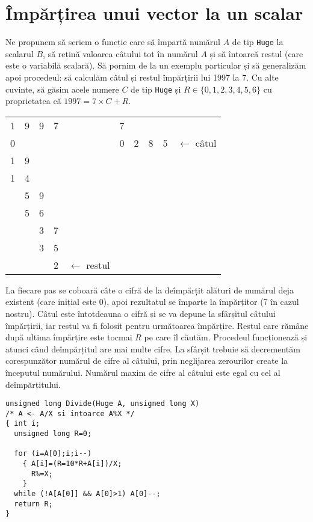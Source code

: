 \section{Împărțirea unui vector la un scalar}

Ne propunem să scriem o funcție care să împartă numărul $A$ de tip {\tt Huge}
la scalarul $B$, să rețină valoarea câtului tot în numărul $A$ și să întoarcă
restul (care este o variabilă scalară). Să pornim de la un exemplu particular
și să generalizăm apoi procedeul: să calculăm câtul și restul împărțirii lui
1997 la 7. Cu alte cuvinte, să găsim acele numere $C$ de tip {\tt Huge} și $R
\in \{0, 1, 2, 3, 4, 5, 6\}$ cu proprietatea că $1997 = 7 \times C + R$.

\begin{center}
  \begin{tabular}{
      llll
      llllll}
    1 & 9 & 9 & 7 & & \multicolumn{1}{|l}{7} & & & & \\ \cline{6-9}
    0 & & & & & \multicolumn{1}{|l}{0} & 2 & 8 & 5 & $\leftarrow$ câtul \\ \cline{1-1}
    1 & 9 & & & & & & & & \\
    1 & 4 & & & & & & & & \\ \cline{1-2}
    & 5 & 9 & & & & & & & \\
    & 5 & 6 & & & & & & & \\ \cline{2-3}
    & & 3 & 7 & & & & & & \\
    & & 3 & 5 & & & & & & \\ \cline{3-4}
    & & & 2 & $\leftarrow$ restul & & & & &
  \end{tabular}
\end{center}

La fiecare pas se coboară câte o cifră de la deîmpărțit alături de numărul
deja existent (care inițial este 0), apoi rezultatul se împarte la împărțitor
(7 în cazul nostru). Câtul este întotdeauna o cifră și se va depune la
sfârșitul câtului împărțirii, iar restul va fi folosit pentru următoarea
împărțire. Restul care rămâne după ultima împărțire este tocmai $R$ pe care îl
căutăm. Procedeul funcționează și atunci când deîmpărțitul are mai multe
cifre. La sfârșit trebuie să decrementăm corespunzător numărul de cifre al
câtului, prin neglijarea zerourilor create la începutul numărului. Numărul
maxim de cifre al câtului este egal cu cel al deîmpărțitului.

\begin{verbatim}
unsigned long Divide(Huge A, unsigned long X)
/* A <- A/X si intoarce A%X */
{ int i;
  unsigned long R=0;

  for (i=A[0];i;i--)
    { A[i]=(R=10*R+A[i])/X;
      R%=X;
    }
  while (!A[A[0]] && A[0]>1) A[0]--;
  return R;
}
\end{verbatim}

